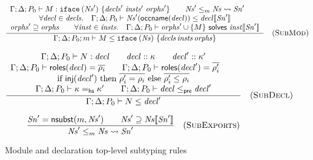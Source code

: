 \begin{figure}


\[
\frac{
\begin{array}{c}
\Gamma; \Delta; P_0 \vdash M : \texttt{iface}\:(\mathit{Ns}')~\{\mathit{decls}'~\mathit{insts}'~\mathit{orphs}'\} \qquad
\mathit{Ns}' \le_m \mathit{Ns} \leadsto \mathit{Sn}' \qquad \\
\forall \mathit{decl} \in \mathit{decls}.\quad \Gamma; \Delta; P_0 \vdash \mathit{Ns}'(\textsf{occname}(\mathit{decl})) \le \mathit{decl}\llbracket\mathit{Sn}'\rrbracket \\
\mathit{orphs}' \supseteq \mathit{orphs} \qquad
\forall \mathit{inst} \in \mathit{insts}.\quad \Gamma; \Delta; P_0 \vdash \mathit{orphs}' \cup \{ M \} ~\textsf{solves}~ \mathit{inst}\llbracket\mathit{Sn}'\rrbracket
\end{array}
}{
\Gamma; \Delta; P_0; m \vdash M \le \texttt{iface}\:(\mathit{Ns})~\{\mathit{decls}\, \mathit{insts}\, \mathit{orphs}\}
}
\quad(\textsc{SubMod})
\]


\[
\frac{
\begin{array}{c}
\Gamma; \Delta; P_0 \vdash N : \mathit{decl} \qquad
\mathit{decl} :: \kappa \qquad
\mathit{decl}' :: \kappa' \\
\Gamma; \Delta; P_0 \vdash \textsf{roles}(\mathit{decl}) = \overline{\rho_i} \qquad
\Gamma; \Delta; P_0 \vdash \textsf{roles}(\mathit{decl}') = \overline{\rho'_i} \qquad
\\
\textrm{if}~\textsf{inj}(\mathit{decl}')
    ~\textrm{then}~ \overline{\rho'_i = \rho_i}
    ~\textrm{else}~ \overline{\rho'_i \le \rho_i} \\
\Gamma; \Delta; P_0 \vdash \kappa =_\mathsf{hs} \kappa' \qquad
\Gamma; \Delta; P_0 \vdash \mathit{decl} \le_\textsf{pre} \mathit{decl}'
\end{array}
}{
\Gamma; \Delta; P_0 \vdash N \le \mathit{decl}'
}
\quad(\textsc{SubDecl})
\]


\[
\frac{
\mathit{Sn}' = \textsf{nsubst}(m, \mathit{Ns}') \qquad
\mathit{Ns}' \supseteq \mathit{Ns}\llbracket\mathit{Sn}'\rrbracket
}{
\mathit{Ns}' \le_m \mathit{Ns} \leadsto \mathit{Sn}'
}
\quad(\textsc{SubExports})
\]

\caption{Module and declaration top-level subtyping rules}
\label{typing:top-subtyping}

\end{figure}

